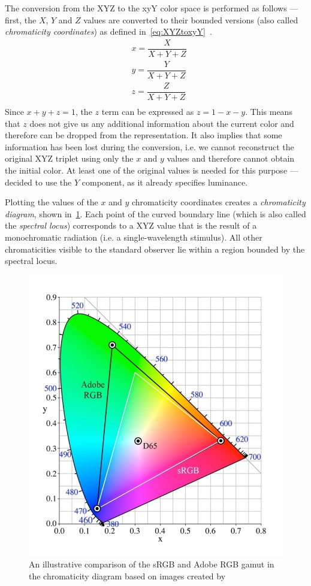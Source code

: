 The conversion from the XYZ to the xyY color space is performed as follows --- first, the $X$, $Y$ and $Z$ values are converted to their bounded versions (also called \emph{chromaticity coordinates}) as defined in~\cref{eq:XYZtoxyY}~\cite{xyYEquations}.
\begin{equation} \label{eq:XYZtoxyY}
\begin{aligned}
&x=\dfrac{X}{X+Y+Z}\\
&y=\dfrac{Y}{X+Y+Z}\\
&z=\dfrac{Z}{X+Y+Z}\\
\end{aligned}
\end{equation}
Since $x+y+z=1$, the $z$ term can be expressed as $z=1-x-y$. This means that $z$ does not give us any additional information about the current color and therefore can be dropped from the representation. It also implies that some information has been lost during the conversion, i.e. we cannot reconstruct the original XYZ triplet using only the $x$ and $y$ values and therefore cannot obtain the initial color. At least one of the original values is needed for this purpose ---~\citet{CIE} decided to use the $Y$ component, as it already specifies luminance.

Plotting the values of the $x$ and $y$ chromaticity coordinates creates a \emph{chromaticity diagram}, shown in~\cref{fig:chromaticityDiagram}. Each point of the curved boundary line (which is also called the \emph{spectral locus}) corresponds to a XYZ value that is the result of a monochromatic radiation (i.e. a single-wavelength stimulus). All other chromaticities visible to the standard observer lie within a region bounded by the spectral locus.

\begin{figure}[t!]
	\centering
	\includegraphics[width=0.6\linewidth,height=0.3\textheight]{img/chromaticity_diagram.jpeg}
	\caption{An illustrative comparison of the sRGB and Adobe RGB gamut in the chromaticity diagram based on images created by~\citet{chromaticityDiagramResource}}
	\label{fig:chromaticityDiagram}
\end{figure}

